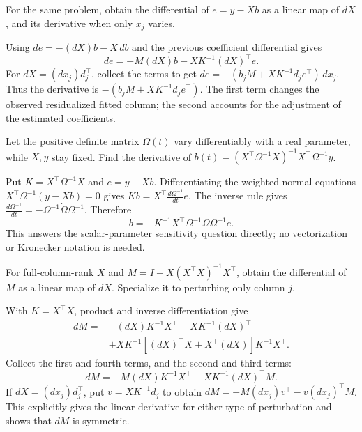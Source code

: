 \begin{problem}
For the same problem, obtain the differential of $e=y-Xb$ as a linear
map of $dX$, and its derivative when only $x_j$ varies.
\end{problem}
\begin{solution}
Using $de=-(dX)b-X\,db$ and the previous coefficient differential gives
\[
de=-M(dX)b-XK^{-1}(dX)^\top e.
\]
For $dX=(dx_j)d_j^\top$, collect the terms to get
$de=-(b_jM+XK^{-1}d_je^\top)\,dx_j$.
Thus the derivative is $-(b_jM+XK^{-1}d_je^\top)$.
The first term changes the observed residualized fitted column; the
second accounts for the adjustment of the estimated coefficients.
\end{solution}

\begin{problem}
Let the positive definite matrix $\Omega(t)$ vary differentiably with a
real parameter, while $X,y$ stay fixed. Find the derivative of
$b(t)=(X^\top\Omega^{-1}X)^{-1}X^\top\Omega^{-1}y$.
\end{problem}
\begin{solution}
Put $K=X^\top\Omega^{-1}X$ and $e=y-Xb$.
Differentiating the weighted normal equations
$X^\top\Omega^{-1}(y-Xb)=0$ gives
$K\dot b=X^\top\frac{d\Omega^{-1}}{dt}e$.
The inverse rule gives $\frac{d\Omega^{-1}}{dt}=-\Omega^{-1}\dot\Omega\Omega^{-1}$.
Therefore
\[
\dot b=-K^{-1}X^\top\Omega^{-1}\dot\Omega\Omega^{-1}e.
\]
This answers the scalar-parameter sensitivity question directly; no
vectorization or Kronecker notation is needed.
\end{solution}

\begin{problem}
For full-column-rank $X$ and $M=I-X(X^\top X)^{-1}X^\top$, obtain the
differential of $M$ as a linear map of $dX$. Specialize it to perturbing
only column $j$.
\end{problem}
\begin{solution}
With $K=X^\top X$, product and inverse differentiation give
\[
\begin{split}
dM={}&-(dX)K^{-1}X^\top-XK^{-1}(dX)^\top\\
&+XK^{-1}[(dX)^\top X+X^\top(dX)]K^{-1}X^\top.
\end{split}
\]
Collect the first and fourth terms, and the second and third terms:
\[
dM=-M(dX)K^{-1}X^\top-XK^{-1}(dX)^\top M.
\]
If $dX=(dx_j)d_j^\top$, put $v=XK^{-1}d_j$ to obtain
$dM=-M(dx_j)v^\top-v(dx_j)^\top M$.
This explicitly gives the linear derivative for either type of
perturbation and shows that $dM$ is symmetric.
\end{solution}

